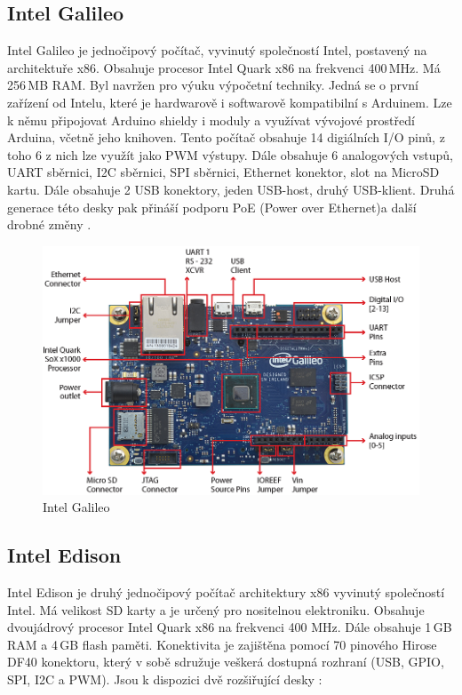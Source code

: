 		\subsection{Intel Galileo}
		Intel Galileo je jednočipový počítač, vyvinutý společností Intel, postavený na architektuře x86. Obsahuje procesor Intel Quark x86 na frekvenci 400\,MHz. Má 256\,MB RAM. Byl navržen pro výuku výpočetní techniky. Jedná se o první zařízení od Intelu, které je hardwarově i softwarově kompatibilní s Arduinem. Lze k němu připojovat Arduino shieldy i moduly a využívat vývojové prostředí Arduina, včetně jeho knihoven. 
		Tento počítač obsahuje 14 digiálních I/O pinů, z toho 6 z nich lze využít jako PWM výstupy. Dále obsahuje 6 analogových vstupů, UART sběrnici, I2C sběrnici, SPI sběrnici, Ethernet konektor, slot na MicroSD kartu. Dále obsahuje 2 USB konektory, jeden USB-host, druhý USB-klient. Druhá generace této desky pak přináší podporu PoE (Power over Ethernet)a další drobné změny \cite{IntelGalileo,ArduinoGalileo}.
\begin{figure}[!h]
  \begin{center}
    \includegraphics[scale=0.5]{obrazky/embed_intel_galileo}
  \end{center}
  \caption{Intel Galileo \cite{IntelGalileo}}
\end{figure}
		
		\newpage
		
		\subsection{Intel Edison} 
		Intel Edison je druhý jednočipový počítač architektury x86 vyvinutý společností Intel. Má velikost SD karty a je určený pro nositelnou elektroniku. Obsahuje dvoujádrový procesor Intel Quark x86 na frekvenci 400 MHz. Dále obsahuje 1\,GB RAM a 4\,GB flash paměti. Konektivita je zajištěna pomocí 70 pinového Hirose DF40 konektoru, který v sobě sdružuje veškerá dostupná rozhraní (USB, GPIO, SPI, I2C a PWM). Jsou k dispozici dvě rozšiřující desky \cite{IntelEdison}:
			
